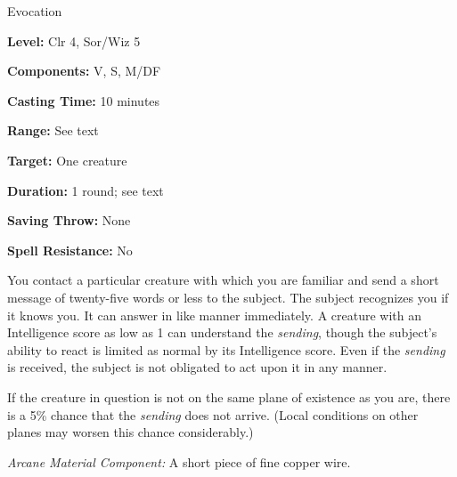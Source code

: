 
Evocation

\textbf{Level:} Clr 4, Sor/Wiz 5

\textbf{Components:} V, S, M/DF

\textbf{Casting Time:} 10 minutes

\textbf{Range:} See text

\textbf{Target:} One creature

\textbf{Duration:} 1 round; see text

\textbf{Saving Throw:} None

\textbf{Spell Resistance:} No

You contact a particular creature with which you are familiar and send a short 
message of twenty-five words or less to the subject. The subject recognizes you 
if it knows you. It can answer in like manner immediately. A creature with an Intelligence 
score as low as 1 can understand the \textit{sending}, though the subject's ability 
to react is limited as normal by its Intelligence score. Even if the \textit{sending 
}is received, the subject is not obligated to act upon it in any manner.

If the creature in question is not on the same plane of existence as you are, there 
is a 5\% chance that the \textit{sending} does not arrive. (Local conditions on 
other planes may worsen this chance considerably.)

\textit{Arcane Material Component:} A short piece of fine copper wire.


